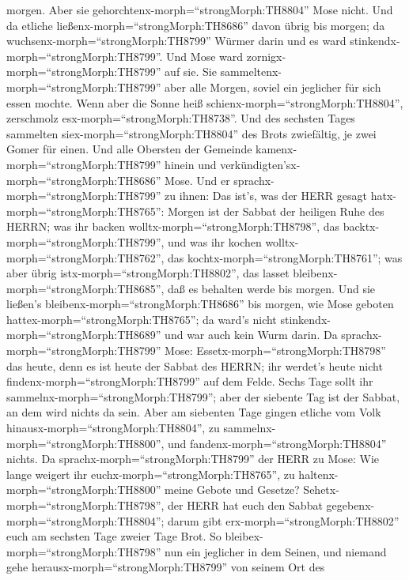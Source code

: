 morgen.  Aber sie gehorchtenx-morph=``strongMorph:TH8804''
Mose nicht. Und da etliche ließenx-morph=``strongMorph:TH8686'' davon
übrig bis morgen; da wuchsenx-morph=``strongMorph:TH8799'' Würmer darin
und es ward stinkendx-morph=``strongMorph:TH8799''. Und Mose ward
zornigx-morph=``strongMorph:TH8799'' auf sie.  Sie
sammeltenx-morph=``strongMorph:TH8799'' aber alle Morgen, soviel ein
jeglicher für sich essen mochte. Wenn aber die Sonne heiß
schienx-morph=``strongMorph:TH8804'', zerschmolz
esx-morph=``strongMorph:TH8738''.  Und des sechsten Tages
sammelten siex-morph=``strongMorph:TH8804'' des Brots zwiefältig, je
zwei Gomer für einen. Und alle Obersten der Gemeinde
kamenx-morph=``strongMorph:TH8799'' hinein und
verkündigten'sx-morph=``strongMorph:TH8686'' Mose.  Und er
sprachx-morph=``strongMorph:TH8799'' zu ihnen: Das ist's, was der HERR
gesagt hatx-morph=``strongMorph:TH8765'': Morgen ist der Sabbat der
heiligen Ruhe des HERRN; was ihr backen
wolltx-morph=``strongMorph:TH8798'', das
backtx-morph=``strongMorph:TH8799'', und was ihr kochen
wolltx-morph=``strongMorph:TH8762'', das
kochtx-morph=``strongMorph:TH8761''; was aber übrig
istx-morph=``strongMorph:TH8802'', das lasset
bleibenx-morph=``strongMorph:TH8685'', daß es behalten werde bis morgen.
 Und sie ließen's bleibenx-morph=``strongMorph:TH8686'' bis
morgen, wie Mose geboten hattex-morph=``strongMorph:TH8765''; da ward's
nicht stinkendx-morph=``strongMorph:TH8689'' und war auch kein Wurm
darin.  Da sprachx-morph=``strongMorph:TH8799'' Mose:
Essetx-morph=``strongMorph:TH8798'' das heute, denn es ist heute der
Sabbat des HERRN; ihr werdet's heute nicht
findenx-morph=``strongMorph:TH8799'' auf dem Felde.  Sechs
Tage sollt ihr sammelnx-morph=``strongMorph:TH8799''; aber der siebente
Tag ist der Sabbat, an dem wird nichts da sein.  Aber am
siebenten Tage gingen etliche vom Volk
hinausx-morph=``strongMorph:TH8804'', zu
sammelnx-morph=``strongMorph:TH8800'', und
fandenx-morph=``strongMorph:TH8804'' nichts.  Da
sprachx-morph=``strongMorph:TH8799'' der HERR zu Mose: Wie lange weigert
ihr euchx-morph=``strongMorph:TH8765'', zu
haltenx-morph=``strongMorph:TH8800'' meine Gebote und Gesetze?
 Sehetx-morph=``strongMorph:TH8798'', der HERR hat euch den
Sabbat gegebenx-morph=``strongMorph:TH8804''; darum gibt
erx-morph=``strongMorph:TH8802'' euch am sechsten Tage zweier Tage Brot.
So bleibex-morph=``strongMorph:TH8798'' nun ein jeglicher in dem Seinen,
und niemand gehe herausx-morph=``strongMorph:TH8799'' von seinem Ort des
